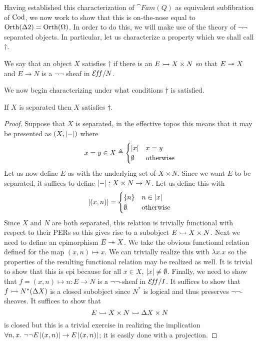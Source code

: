 Having established this characterization of $\cat{Fam}(Q)$ as
equivalent subfibration of $\operatorname{Cod}$, we now work to show that this is
on-the-nose equal to $\operatorname{Orth}(\Delta 2) = \operatorname{Orth}(\Omega)$. In order to do
this, we will make use of the theory of $\neg\neg$ separated
objects. In particular, let us characterize a property which we shall
call $\dagger$.
\begin{defn}\label{defn:orth:coveredsep}
  We say that an object $X$ satisfies $\dagger$ if there is an
  $E \rightarrowtail X \times N$ so that $E \twoheadrightarrow X$ and $E \to N$ is a
  $\neg\neg$ sheaf in $\mathcal{E}\!f\!f/N$.
\end{defn}
We now begin characterizing under what conditions $\dagger$ is
satisfied.
\begin{lem}\label{lem:orth:sepimpliesdagger}
  If $X$ is separated then $X$ satisfies $\dagger$.
\end{lem}
\begin{proof}
  Suppose that $X$ is separated, in the effective topos this means
  that it may be presented as $(X, \left\vert-\right\vert)$ where
  \[
    x = y \in X \triangleq
    \begin{cases}
      \left\vert x\right\vert & x = y\\
      \emptyset & \text{otherwise}
    \end{cases}
  \]
  Let us now define $E$ as with the underlying set of $X \times N$.
  Since we want $E$ to be separated, it suffices to define
  $\left\vert-\right\vert : X \times N \to N$. Let us define this with
  \[
    \left\vert(x, n)\right\vert =
    \begin{cases}
      \{n\} & n \in \left\vert x\right\vert\\
      \emptyset & \text{otherwise}
    \end{cases}
  \]
  Since $X$ and $N$ are both separated, this relation is trivially
  functional with respect to their PERs so this gives rise to a
  subobject $E \rightarrowtail X \times N$. Next we need to define an
  epimorphism $E \twoheadrightarrow X$. We take the obvious functional relation
  defined for the map $(x, n) \mapsto x$. We can trivially realize
  this with $\lambda x. x$ so the properties of the resulting
  functional relation may be realized as well. It is trivial to show
  that this is epi because for all $x \in X$,
  $\left\vert x\right\vert \neq \emptyset$. Finally, we need to show that
  $f = (x, n) \mapsto n : E \to N$ is a $\neg\neg$-sheaf in $\mathcal{E}\!f\!f/I$. It
  suffices to show that $f \rightarrowtail N^*(\Delta X)$ is a closed subobject
  since $N^*$ is logical and thus preserves $\neg\neg$-sheaves. It
  suffices to show that
  \[
    E \rightarrowtail X \times N \rightarrowtail \Delta X \times N
  \]
  is closed but this is a trivial exercise in realizing the
  implication $\forall n, x.\ \neg\neg E\left\vert(x, n)\right\vert \to E\left\vert(x, n)\right\vert$;
  it is easily done with a projection.
\end{proof}
